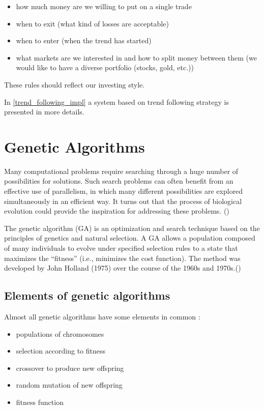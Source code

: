 \begin{itemize}
  \item how much money are we willing to put on a single trade
  \item when to exit (what kind of losses are acceptable)
  \item when to enter (when the trend has started) 
  \item what markets are we interested in and how to split money between them (we would like to have a diverse portfolio (stocks, gold, etc.))
\end{itemize}

These rules should reflect our investing style.

In \ref{trend_following_impl} a system based on trend following strategy is presented in more details.


\section{Genetic Algorithms}
\label{sec:genAlgorithms}

Many computational problems require searching through a huge number of possibilities for solutions.
Such search problems can often benefit from an effective use of parallelism, in which many different possibilities are explored simultaneously in an efficient way. 
It turns out that the process of biological evolution could provide the inspiration for addressing these problems.
(\cite{Mitchell01})

The genetic algorithm (GA) is an optimization and search technique based on the principles of genetics and natural selection.
A GA allows a population composed of many individuals to evolve under specified selection rules to a state that maximizes the “fitness” (i.e., minimizes the cost function).
The method was developed by John Holland (1975) over the course of the 1960s and 1970s.(\cite{Haupt:2004:PGA:1007746})



\subsection{Elements of genetic algorithms}

Almost all genetic algorithms have some elements in common \cite{Mitchell01}:
\begin{itemize}
  \item populations of chromosomes
  \item selection according to fitness
  \item crossover to produce new offspring
  \item random mutation of new offspring
  \item fitness function
\end{itemize}

